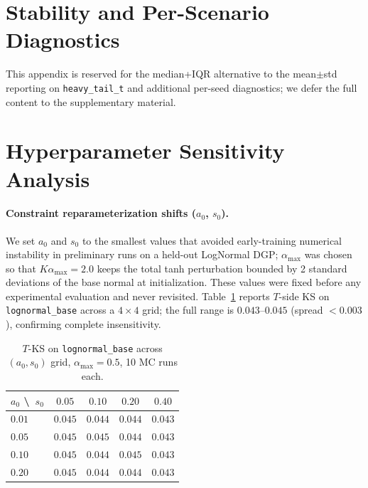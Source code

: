 \appendix

\section{Stability and Per-Scenario Diagnostics}
\label{app:stability}

This appendix is reserved for the median+IQR alternative to the
mean$\pm$std reporting on \texttt{heavy\_tail\_t} and additional
per-seed diagnostics; we defer the full content to the supplementary
material.

\section{Hyperparameter Sensitivity Analysis}
\label{app:sensitivity}

\paragraph{Constraint reparameterization shifts ($a_0$, $s_0$).}
We set $a_0$ and $s_0$ to the smallest values that avoided
early-training numerical instability in preliminary runs on a held-out
LogNormal DGP; $\alpha_{\max}$ was chosen so that
$K \alpha_{\max} = 2.0$ keeps the total tanh perturbation bounded by 2
standard deviations of the base normal at initialization. These values
were fixed before any experimental evaluation and never revisited.
Table~\ref{tab:sens-a0s0} reports $T$-side KS on
\texttt{lognormal\_base} across a $4 \times 4$ grid; the full range is
$0.043$--$0.045$ (spread $< 0.003$), confirming complete insensitivity.

\begin{table}[h]
\caption{$T$-KS on \texttt{lognormal\_base} across $(a_0, s_0)$ grid,
$\alpha_{\max} = 0.5$, 10 MC runs each.}
\label{tab:sens-a0s0}
\centering
\small
\begin{tabular}{lcccc}
\toprule
$a_0$ \textbackslash\ $s_0$ & $0.05$ & $0.10$ & $0.20$ & $0.40$ \\
\midrule
$0.01$ & $0.045$ & $0.044$ & $0.044$ & $0.043$ \\
$0.05$ & $0.045$ & $0.045$ & $0.044$ & $0.043$ \\
$0.10$ & $0.045$ & $0.044$ & $0.045$ & $0.043$ \\
$0.20$ & $0.045$ & $0.044$ & $0.044$ & $0.043$ \\
\bottomrule
\end{tabular}
\end{table}

